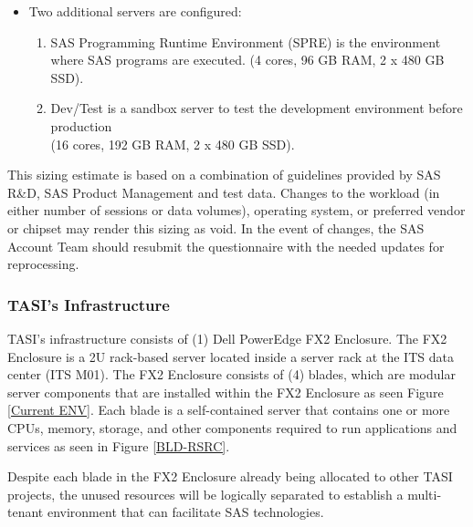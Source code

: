 \begin{enumerate}
\begin{itemize}
        \item Two additional servers are configured: 
        \begin{enumerate}
            \item SAS Programming Runtime Environment (SPRE) is the environment where SAS programs are executed. (4 cores, 96 GB RAM, 2 x 480 GB SSD). 
            \item Dev/Test is a sandbox server to test the development environment before production \\(16 cores, 192 GB RAM, 2 x 480 GB SSD).
        \end{enumerate}
    \end{itemize}
    
\end{enumerate}

This sizing estimate is based on a combination of guidelines provided by SAS R\&D, SAS Product Management and test data. Changes to the workload (in either number of sessions or data volumes), operating system, or preferred vendor or chipset may render this sizing as void. In the event of changes, the SAS Account Team should resubmit the questionnaire with the needed updates for reprocessing. 

\subsubsection{TASI's Infrastructure}
\label{TASI's Infrastructure Section Header}

TASI's infrastructure consists of (1) Dell PowerEdge FX2 Enclosure. The FX2 Enclosure is a 2U rack-based server located inside a server rack at the ITS data center (ITS M01). The FX2 Enclosure consists of (4) blades, which are modular server components that are installed within the FX2 Enclosure as seen Figure \ref{Current ENV}. Each blade is a self-contained server that contains one or more CPUs, memory, storage, and other components required to run applications and services as seen in Figure \ref{BLD-RSRC}.

Despite each blade in the FX2 Enclosure already being allocated to other TASI projects, the unused resources will be logically separated to establish a multi-tenant environment that can facilitate SAS technologies.

